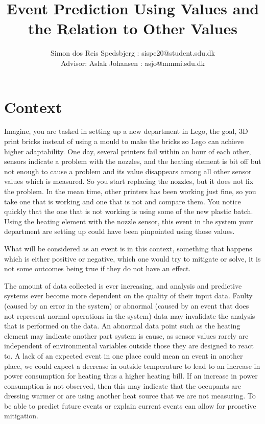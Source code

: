 \documentclass[a4paper,8pt]{article}
\title{Event Prediction Using Values and the Relation to Other Values}
\author{Simon dos Reis Spedsbjerg : sispe20@student.sdu.dk\\ {\small Advisor: Aslak Johansen : asjo@mmmi.sdu.dk}}
\begin{document}
	\maketitle
	\section{Context}
		Imagine, you are tasked in setting up a new department in Lego, the goal, 3D print bricks instead of using a mould to make the bricks so Lego can achieve higher adaptability. One day, several printers fail within an hour of each other, sensors indicate a problem with the nozzles, and the heating element is bit off but not enough to cause a problem and its value disappears among all other sensor values which is measured. So you start replacing the nozzles, but it does not fix the problem. In the mean time, other printers has been working just fine, so you take one that is working and one that is not and compare them. You notice quickly that the one that is not working is using some of the new plastic batch. Using the heating element with the nozzle sensor, this event in the system your department are setting up could have been pinpointed using those values.
		
		What will be considered as an event is in this context, something that happens which is either positive or negative, which one would try to mitigate or solve, it is not some outcomes being true if they do not have an effect.
		
		The amount of data collected is ever increasing, and analysis and predictive systems ever become more dependent on the quality of their input data. Faulty (caused by an error in the system) or abnormal (caused by an event that does not represent normal operations in the system) data may invalidate the analysis that is performed on the data. An abnormal data point such as the heating element may indicate another part system is cause, as sensor values rarely are independent of environmental variables outside those they are designed to react to. A lack of an expected event in one place could mean an event in another place, we could expect a decrease in outside temperature to lead to an increase in power consumption for heating thus a higher heating bill. If an increase in power consumption is not observed, then this may indicate that the occupants are dressing warmer or are using another heat source that we are not measuring. To be able to predict future events or explain current events can allow for proactive mitigation. 
		
\end{document}
